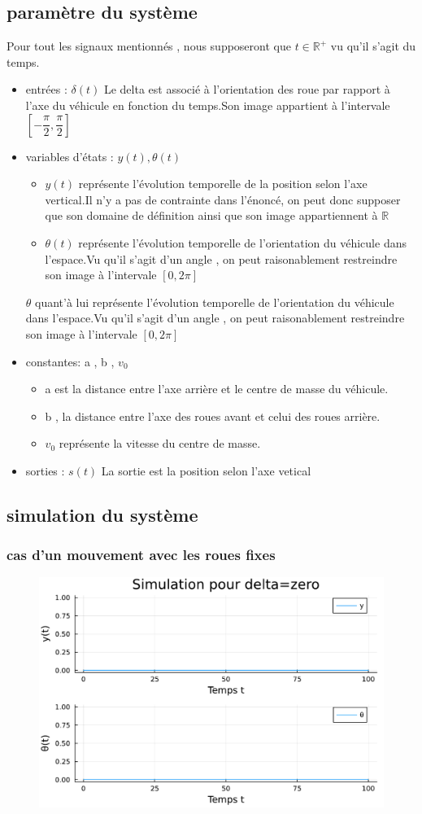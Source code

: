 \documentclass[11pt,a4paper]{article}
\begin{document}
\subsection{paramètre du système}
Pour tout les signaux mentionnés , nous supposeront que $t \in \mathbb{R}^+$ vu qu'il s'agit du temps.
\begin{itemize}
	\item entrées : $\delta(t)$
	      Le delta est associé à l'orientation des roue par rapport à l'axe du véhicule en fonction du temps.Son image appartient à l'intervale $[-\dfrac{\pi}{2},\dfrac{\pi}{2}]$
	\item variables d'états : $y(t),\theta(t)$
    \begin{itemize}
      \item $y(t)$ représente l'évolution temporelle de la position selon l'axe vertical.Il n'y a pas de contrainte dans l'énoncé, on peut donc supposer que son domaine de définition ainsi que son image appartiennent à $\mathbb{R}$
      \item $\theta(t)$ représente l'évolution temporelle de l'orientation du véhicule dans l'espace.Vu qu'il s'agit d'un angle , on peut raisonablement restreindre son image à l'intervale $ [ 0 , 2\pi]$
    \end{itemize}
	      $\theta$ quant'à lui représente l'évolution temporelle de l'orientation du véhicule dans l'espace.Vu qu'il s'agit d'un angle , on peut raisonablement restreindre son image à l'intervale $[ 0,2\pi]$
	\item constantes: a , b , $v_0$ \begin{itemize}
	 \item 
    a est la distance entre l'axe arrière et le centre de masse du véhicule. 
    \item b , la distance entre l'axe des roues avant et celui des roues arrière.
    \item $v_0$ représente la vitesse du centre de masse.

	\end{itemize}
	\item sorties : $s(t)$
	      La sortie est la position selon l'axe vetical
\end{itemize}
\subsection{simulation du système}
\subsubsection{cas d'un mouvement avec les roues fixes}
\begin{figure}[!h]
	\centering
	\includegraphics[width=0.5\linewidth]{../code/jlplots/Q1_3_zero.pdf}
\end{figure}
\newpage
\end{document}
